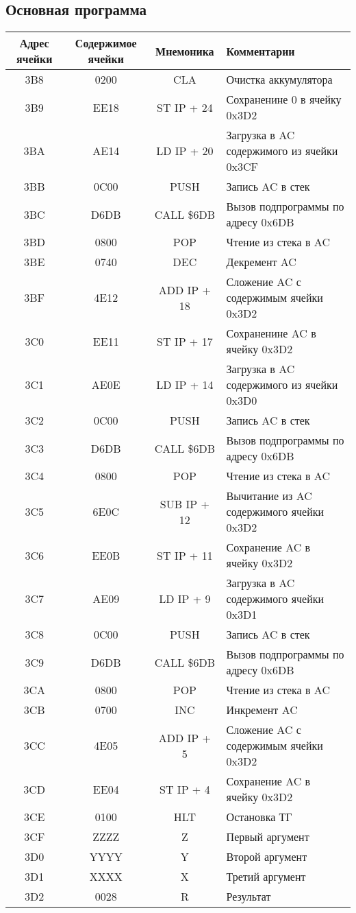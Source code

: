 \subsection{Основная программа}
\begin{center}
	\begin{tabular}{|c|c|c|l|}
		\hline
		\textbf{Адрес ячейки} & \textbf{Содержимое ячейки} & \textbf{Мнемоника} & \textbf{Комментарии}\\
		\hline
		3B8 & 0200 & CLA & Очистка аккумулятора \\
		3B9 & EE18 & ST IP + 24 & Сохраненине 0 в ячейку 0x3D2 \\
		\hline
		3BA & AE14 & LD IP + 20 & Загрузка в AC содержимого из ячейки 0x3CF \\
		3BB & 0C00 & PUSH & Запись AC в стек \\
		3BC & D6DB & CALL \$6DB & Вызов подпрограммы по адресу 0x6DB \\
		3BD & 0800 & POP & Чтение из стека в AC \\
		3BE & 0740 & DEC & Декремент AC \\
		3BF & 4E12 & ADD IP + 18 & Сложение AC с содержимым ячейки 0x3D2 \\
		3C0 & EE11 & ST IP + 17 & Сохраненине AC в ячейку 0x3D2 \\
		\hline
		3C1 & AE0E & LD IP + 14 & Загрузка в AC содержимого из ячейки 0x3D0 \\
		3C2 & 0C00 & PUSH & Запись AC в стек \\
		3C3 & D6DB & CALL \$6DB & Вызов подпрограммы по адресу 0x6DB \\
		3C4 & 0800 & POP & Чтение из стека в AC \\
		3C5 & 6E0C & SUB IP + 12 & Вычитание из AC содержимого ячейки 0x3D2 \\
		3C6 & EE0B & ST IP + 11 & Сохранение AC в ячейку 0x3D2 \\
		\hline
		3C7 & AE09 & LD IP + 9 & Загрузка в AC содержимого ячейки 0x3D1 \\
		3C8 & 0C00 & PUSH & Запись AC в стек \\
		3C9 & D6DB & CALL \$6DB & Вызов подпрограммы по адресу 0x6DB \\
		3CA & 0800 & POP & Чтение из стека в AC \\
		3CB & 0700 & INC & Инкремент AC \\
		3CC & 4E05 & ADD IP + 5 & Сложение AC с содержимым ячейки 0x3D2 \\
		3CD & EE04 & ST IP + 4 & Сохранение AC в ячейку 0x3D2 \\
		3CE & 0100 & HLT & Остановка ТГ \\
		\hline
		3CF & ZZZZ & Z & Первый аргумент \\
		3D0 & YYYY & Y & Второй аргумент \\
		3D1 & XXXX & X & Третий аргумент \\
		3D2 & 0028 & R & Результат \\
		\hline
	\end{tabular}
\end{center}

